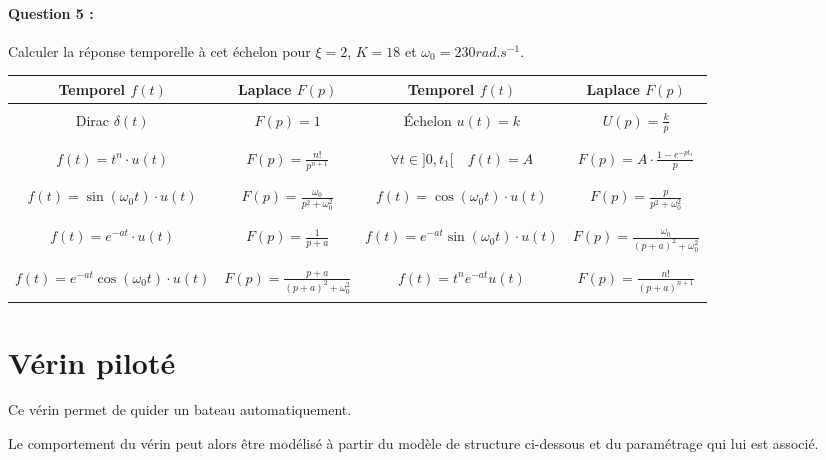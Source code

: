 \paragraph{Question 5 :} Calculer la réponse temporelle à cet échelon pour $\xi=2$, $K=18$ et $\omega_0=230rad.s^{-1}$.

\begin{center}
\begin{tabular}{|c|c||c|c|}
\hline
Temporel $f(t)$ & Laplace $F(p)$ & 
Temporel $f(t)$ & Laplace $F(p)$ \\
\hline
\hline
 &&& \\
Dirac $\delta(t)$ &
$F(p)=1$ &
Échelon $ u(t)=k $&
$ U(p) = \frac{k}{p}$
\\
&&& \\
\hline
&&& \\
$f(t) = t^n\cdot u(t)$ &
$F(p)=\frac{n!}{p^{n+1}} $ &
$\forall t\in ]0,t_1 [ \quad f(t)= A$ & 
$F(p) =A \cdot \frac{1-e^{-pt_1}}{p} $\\
&&& \\
\hline
&&& \\
$f(t) = \sin \left( \omega_0 t\right) \cdot u(t)$ &
$F(p) = \frac{\omega_0}{p^2+\omega_0^2} $ &
$f(t) = \cos \left( \omega_0 t\right) \cdot u(t)$ & 
$F(p) = \frac{p}{p^2+\omega_0^2} $ \\
&&& \\
\hline
&&& \\
$f(t)= e^{-at}\cdot u(t)$ & 
$F(p)= \frac{1}{p+a}$ &
$f(t) = e^{-at}\sin\left( \omega_0 t\right) \cdot u(t)$ &
$F(p)=\frac{\omega_0}{\left( p+a\right)^2 + \omega_0^2}$  \\
&&& \\
\hline
&&& \\
$f(t) = e^{-at}\cos\left( \omega_0 t\right) \cdot u(t)$ &
$F(p)=\frac{p+a}{\left( p+a\right)^2 + \omega_0^2}$  &
$f(t)=t^ne^{-at}u(t)$ & $F(p)=\frac{n!}{\left( p+a\right)^{n+1}}$ \\
&&& \\
\hline
\end{tabular}
\end{center}

\newpage

\section{Vérin piloté}

Ce vérin permet de quider un bateau automatiquement.

Le comportement du vérin peut alors être modélisé à partir du modèle de structure ci-dessous et du paramétrage qui lui est associé.

